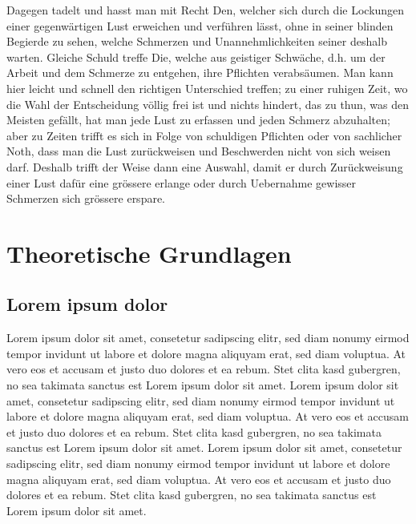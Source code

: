 \documentclass[%
	BCOR12mm, %
	cleardoublepage=empty, %
	tablecaptionabove, %
	toc=bib, %
	toc=listofnumbered, %
	listof=leveldown, %
	numbers=noendperiod %
	]{scrbook}
\begin{document}
Dagegen tadelt und hasst man mit Recht Den, welcher sich durch die Lockungen einer gegenwärtigen Lust erweichen und verführen lässt, ohne in seiner blinden Begierde zu sehen, welche Schmerzen und Unannehmlichkeiten seiner deshalb warten. Gleiche Schuld treffe Die, welche aus geistiger Schwäche, d.h. um der Arbeit und dem Schmerze zu entgehen, ihre Pflichten verabsäumen. Man kann hier leicht und schnell den richtigen Unterschied treffen; zu einer ruhigen Zeit, wo die Wahl der Entscheidung völlig frei ist und nichts hindert, das zu thun, was den Meisten gefällt, hat man jede Lust zu erfassen und jeden Schmerz abzuhalten; aber zu Zeiten trifft es sich in Folge von schuldigen Pflichten oder von sachlicher Noth, dass man die Lust zurückweisen und Beschwerden nicht von sich weisen darf. Deshalb trifft der Weise dann eine Auswahl, damit er durch Zurückweisung einer Lust dafür eine grössere erlange oder durch Uebernahme gewisser Schmerzen sich grössere erspare.


\chapter{Theoretische Grundlagen} %
\label{cha:theoretische_grundlagen}

\section{Lorem ipsum dolor} %
\label{sec:lorem_ipsum_dolor}

Lorem ipsum dolor sit amet, consetetur sadipscing elitr, sed diam nonumy eirmod tempor invidunt ut labore et dolore magna aliquyam erat, sed diam voluptua. At vero eos et accusam et justo duo dolores et ea rebum. Stet clita kasd gubergren, no sea takimata sanctus est Lorem ipsum dolor sit amet. Lorem ipsum dolor sit amet, consetetur sadipscing elitr, sed diam nonumy eirmod tempor invidunt ut labore et dolore magna aliquyam erat, sed diam voluptua. At vero eos et accusam et justo duo dolores et ea rebum. Stet clita kasd gubergren, no sea takimata sanctus est Lorem ipsum dolor sit amet. Lorem ipsum dolor sit amet, consetetur sadipscing elitr, sed diam nonumy eirmod tempor invidunt ut labore et dolore magna aliquyam erat, sed diam voluptua. At vero eos et accusam et justo duo dolores et ea rebum. Stet clita kasd gubergren, no sea takimata sanctus est Lorem ipsum dolor sit amet.
\end{document}
